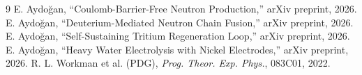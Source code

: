 \documentclass[12pt,a4paper]{article}
\begin{document}
\begin{thebibliography}{9}
 E. Aydoğan, ``Coulomb-Barrier-Free Neutron Production,'' arXiv preprint, 2026.
 E. Aydoğan, ``Deuterium-Mediated Neutron Chain Fusion,'' arXiv preprint, 2026.
 E. Aydoğan, ``Self-Sustaining Tritium Regeneration Loop,'' arXiv preprint, 2026.
 E. Aydoğan, ``Heavy Water Electrolysis with Nickel Electrodes,'' arXiv preprint, 2026.
 R. L. Workman et al. (PDG), \textit{Prog. Theor. Exp. Phys.}, 083C01, 2022.
\end{thebibliography}
\end{document}
